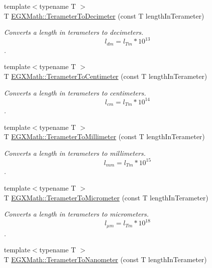 \begin{DoxyCompactItemize}
{\footnotesize template$<$typename T $>$ }\\T \mbox{\hyperlink{group___e_g_x_math-_conversions-_length_conversions-_s_i-_terameter-_s_i_ga988c084c9508f38112e2e39ed74782d5}{E\+G\+X\+Math\+::\+Terameter\+To\+Decimeter}} (const T length\+In\+Terameter)
\begin{DoxyCompactList}\small\item\em Converts a length in terameters to decimeters. \[ l_{dm}=l_{Tm} * 10^{13} \]. \end{DoxyCompactList}\item 
{\footnotesize template$<$typename T $>$ }\\T \mbox{\hyperlink{group___e_g_x_math-_conversions-_length_conversions-_s_i-_terameter-_s_i_gad280a7bb7ff83217a496db8168c27ee9}{E\+G\+X\+Math\+::\+Terameter\+To\+Centimeter}} (const T length\+In\+Terameter)
\begin{DoxyCompactList}\small\item\em Converts a length in terameters to centimeters. \[ l_{cm}=l_{Tm} * 10^{14} \]. \end{DoxyCompactList}\item 
{\footnotesize template$<$typename T $>$ }\\T \mbox{\hyperlink{group___e_g_x_math-_conversions-_length_conversions-_s_i-_terameter-_s_i_gaff9d9c2af8681eacbb3d5d01cb9f9cfa}{E\+G\+X\+Math\+::\+Terameter\+To\+Millimeter}} (const T length\+In\+Terameter)
\begin{DoxyCompactList}\small\item\em Converts a length in terameters to millimeters. \[ l_{mm}=l_{Tm} * 10^{15} \]. \end{DoxyCompactList}\item 
{\footnotesize template$<$typename T $>$ }\\T \mbox{\hyperlink{group___e_g_x_math-_conversions-_length_conversions-_s_i-_terameter-_s_i_ga4f6fb943e4c16178f4060c01a9c00a02}{E\+G\+X\+Math\+::\+Terameter\+To\+Micrometer}} (const T length\+In\+Terameter)
\begin{DoxyCompactList}\small\item\em Converts a length in terameters to micrometers. \[ l_{\mu m}=l_{Tm} * 10^{18} \]. \end{DoxyCompactList}\item 
{\footnotesize template$<$typename T $>$ }\\T \mbox{\hyperlink{group___e_g_x_math-_conversions-_length_conversions-_s_i-_terameter-_s_i_ga01da3f80c1d7cf73956140fa84ad615c}{E\+G\+X\+Math\+::\+Terameter\+To\+Nanometer}} (const T length\+In\+Terameter)

\end{DoxyCompactItemize}

